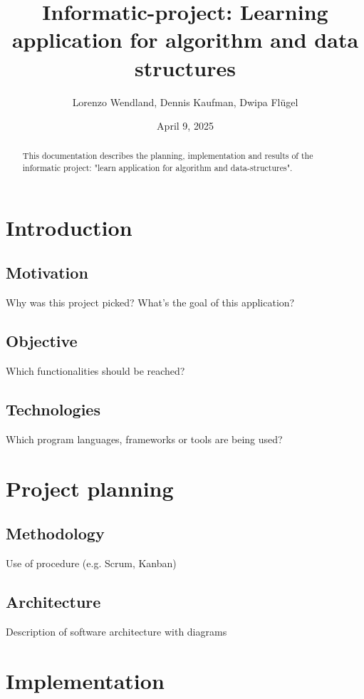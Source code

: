 \documentclass[a4paper, 12pt]{article}
\title{Informatic-project: Learning application for algorithm and data structures}
\author{Lorenzo Wendland, Dennis Kaufman, Dwipa Flügel}
\date{April 9, 2025}
\begin{document}
\maketitle

\begin{abstract}
This documentation describes the planning, implementation and results of the informatic project: "learn application for algorithm and data-structures".

\end{abstract}

\tableofcontents %

\section{Introduction}
\subsection{Motivation}
Why was this project picked? What's the goal of this application?

\subsection{Objective}
Which functionalities should be reached?

\subsection{Technologies}
Which program languages, frameworks or tools are being used?

\section{Project planning}
\subsection{Methodology}
Use of procedure (e.g. Scrum, Kanban)

\subsection{Architecture}
Description of software architecture with diagrams

\section{Implementation}
\end{document}

